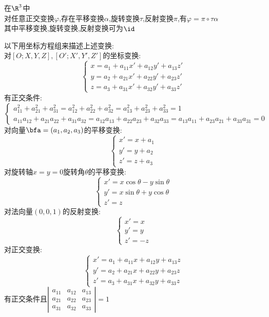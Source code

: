 
\begin{dingli}
在$\R^3$中\\
对任意正交变换$\varphi$,存在平移变换$\alpha$,旋转变换$\tau$,反射变换$\pi$,有$\varphi=\pi\circ\tau\alpha$\\
其中平移变换,旋转变换,反射变换可为$\id$
\end{dingli}

\begin{zhu}
以下用坐标方程组来描述上述变换:\\
对$[O;X,Y,Z],[O';X',Y',Z']$的坐标变换:
\[\begin{cases*}x=a_1+a_{11}x'+a_{12}y'+a_{13}z'\\y=a_2+a_{21}x'+a_{22}y'+a_{23}z'\\z=a_3+a_{31}x'+a_{32}y'+a_{33}z'\end{cases*}\]
有正交条件:
\[\begin{cases*}a_{11}^2+a_{21}^2+a_{31}^2=a_{12}^2+a_{22}^2+a_{32}^2=a_{13}^2+a_{23}^2+a_{33}^2=1\\a_{11}a_{12}+a_{21}a_{22}+a_{31}a_{32}=a_{12}a_{13}+a_{22}a_{23}+a_{32}a_{33}=a_{13}a_{11}+a_{23}a_{21}+a_{33}a_{31}=0\end{cases*}\]
对向量$\bfa=(a_1,a_2,a_3)$的平移变换:
\[\begin{cases*}x'=x+a_1\\y'=y+a_2\\z'=z+a_3\end{cases*}\]
对旋转轴$x=y=0$旋转角$\theta$的平移变换:
\[\begin{cases*}x'=x\cos\theta-y\sin\theta\\y'=x\sin\theta+y\cos\theta\\z'=z\end{cases*}\]
对法向量$(0,0,1)$的反射变换:
\[\begin{cases*}x'=x\\y'=y \\z'=-z\end{cases*}\]
对正交变换:
\[\begin{cases*}x'=a_1+a_{11}x+a_{12}y+a_{13}z\\y'=a_2+a_{21}x+a_{22}y+a_{23}z\\z'=a_3+a_{31}x+a_{32}y+a_{33}z\end{cases*}\]
有正交条件且$\left|\begin{matrix*}a_{11}&a_{12}&a_{13}\\a_{21}&a_{22}&a_{23}\\a_{31}&a_{32}&a_{33}\end{matrix*}\right|=1$
\end{zhu}

%